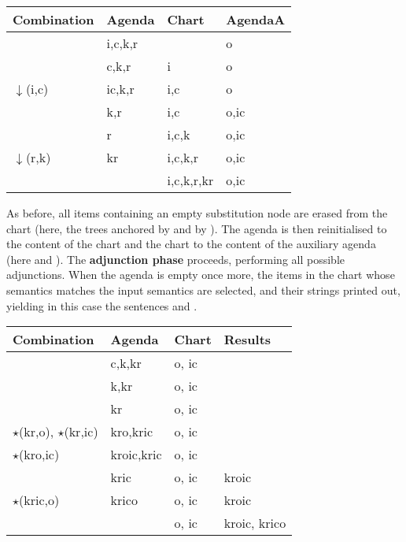 \begin{center}
{\footnotesize
\begin{tabular}{|p{8em}|p{6em}|p{6em}|p{5em}|}
\hline
Combination        & Agenda     & Chart      & AgendaA  \\
                     \hline
                   & i,c,k,r    &            & o        \\
                   & c,k,r      & i          & o        \\
$\downarrow$(i,c)  & ic,k,r     & i,c        & o        \\
                   & k,r        & i,c        & o,ic     \\
                   & r          & i,c,k      & o,ic     \\
$\downarrow$(r,k)  & kr         & i,c,k,r    & o,ic     \\
                   &            & i,c,k,r,kr & o,ic     \\
\hline
\end{tabular}}
\end{center}

As before, all items containing an empty substitution node are erased
from the chart (here, the trees anchored by 
and by ).  The agenda is then reinitialised to the
content of the chart and the chart to the content of the auxiliary
agenda (here  and ).
The \textbf{adjunction phase} proceeds, performing all possible
adjunctions.  When the agenda is empty
once more, the items in the
chart whose semantics matches the input semantics are selected, and
their strings printed out, yielding in this case the sentences
 and
.

\begin{center}
{\footnotesize
\begin{tabular}{|p{8em}|p{6em}|p{6em}|p{5em}|}
\hline
Combination                   & Agenda     & Chart      & Results  \\
                                \hline
                              & c,k,kr     & o, ic      & \\
                              & k,kr       & o, ic      & \\
                              & kr         & o, ic      & \\
$\star$(kr,o), $\star$(kr,ic) & kro,kric   & o, ic      & \\
$\star$(kro,ic)               & kroic,kric & o, ic      & \\
                              & kric       & o, ic      & kroic \\
$\star$(kric,o)               & krico      & o, ic      & kroic \\
                              &            & o, ic      & kroic, krico \\
\hline
\end{tabular}}
\end{center}

